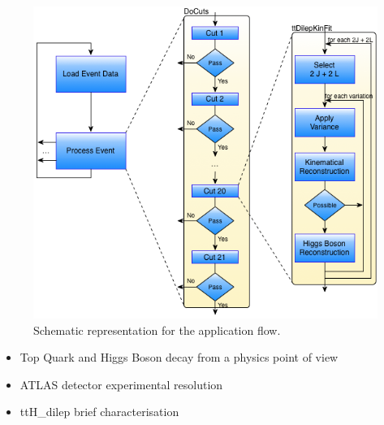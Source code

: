 \begin{figure}[!htp]
	\begin{center}
		\includegraphics[scale=0.4]{images/graf_abstract_flow_with_kinfit.png}
		\caption{Schematic representation for the \tth application flow.}
		\label{fig:flow}
	\end{center}
\end{figure}

\begin{itemize}
	\item Top Quark and Higgs Boson decay from a physics point of view
	\item ATLAS detector experimental resolution
	\item ttH\_dilep brief characterisation
\end{itemize}
